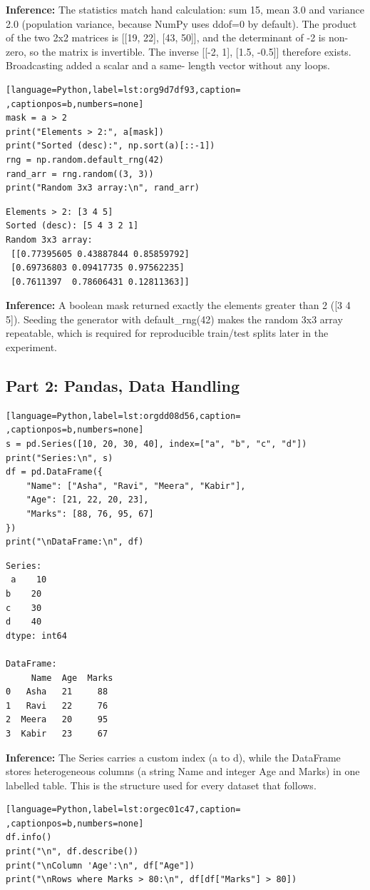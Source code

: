 \documentclass[11pt]{article}
\begin{document}
\textbf{Inference:} The statistics match hand calculation: sum 15, mean 3.0 and variance 2.0 (population
variance, because NumPy uses ddof=0 by default). The product of the two 2x2 matrices is
[[19, 22], [43, 50]], and the determinant of -2 is non-zero, so the matrix is invertible.
The inverse [[-2, 1], [1.5, -0.5]] therefore exists. Broadcasting added a scalar and a same-
length vector without any loops.
\begin{lstlisting}[language=Python,label=lst:org9d7df93,caption= ,captionpos=b,numbers=none]
mask = a > 2
print("Elements > 2:", a[mask])
print("Sorted (desc):", np.sort(a)[::-1])
rng = np.random.default_rng(42)
rand_arr = rng.random((3, 3))
print("Random 3x3 array:\n", rand_arr)
\end{lstlisting}

\begin{verbatim}
Elements > 2: [3 4 5]
Sorted (desc): [5 4 3 2 1]
Random 3x3 array:
 [[0.77395605 0.43887844 0.85859792]
 [0.69736803 0.09417735 0.97562235]
 [0.7611397  0.78606431 0.12811363]]
\end{verbatim}


\textbf{Inference:} A boolean mask returned exactly the elements greater than 2 ([3 4 5]). Seeding the generator
with default\_rng(42) makes the random 3x3 array repeatable, which is required for
reproducible train/test splits later in the experiment.

\subsection*{Part 2: Pandas, Data Handling}
\label{sec:orgdd1b23b}

\begin{lstlisting}[language=Python,label=lst:orgdd08d56,caption= ,captionpos=b,numbers=none]
s = pd.Series([10, 20, 30, 40], index=["a", "b", "c", "d"])
print("Series:\n", s)
df = pd.DataFrame({
    "Name": ["Asha", "Ravi", "Meera", "Kabir"],
    "Age": [21, 22, 20, 23],
    "Marks": [88, 76, 95, 67]
})
print("\nDataFrame:\n", df)
\end{lstlisting}

\begin{verbatim}
Series:
 a    10
b    20
c    30
d    40
dtype: int64

DataFrame:
     Name  Age  Marks
0   Asha   21     88
1   Ravi   22     76
2  Meera   20     95
3  Kabir   23     67
\end{verbatim}

\textbf{Inference:} The Series carries a custom index (a to d), while the DataFrame stores heterogeneous columns
(a string Name and integer Age and Marks) in one labelled table. This is the structure used
for every dataset that follows.
\begin{lstlisting}[language=Python,label=lst:orgec01c47,caption= ,captionpos=b,numbers=none]
df.info()
print("\n", df.describe())
print("\nColumn 'Age':\n", df["Age"])
print("\nRows where Marks > 80:\n", df[df["Marks"] > 80])
\end{lstlisting}
\end{document}

